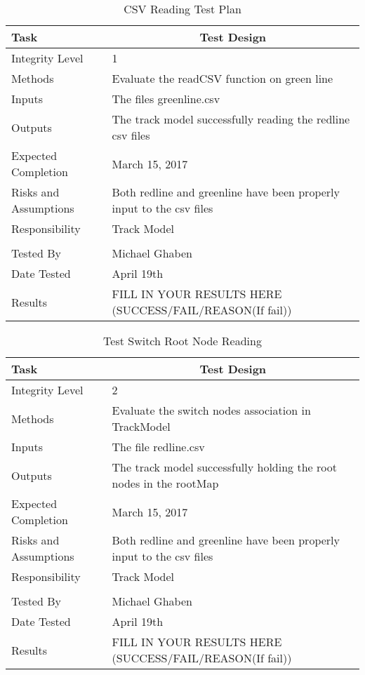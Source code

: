 \documentclass[]{article}
\begin{document}
\begin{table}[H]
	\centering
	\caption{CSV Reading Test Plan}
	\begin{tabular}{|l|l|}
		\hline
		Task & \multicolumn{1}{c|}{Test Design} \\ \hline
		Integrity Level & 1 \\ \hline
		Methods & Evaluate the readCSV function on green line\\ \hline
		Inputs &  The files greenline.csv \\ \hline
		Outputs &  The track model successfully reading the redline csv files\\ \hline
		Expected Completion & March 15, 2017\\ \hline
		Risks and Assumptions & \parbox[t]{10cm}{Both redline and greenline have been properly input to the csv files}\\ \hline
		Responsibility & Track Model\\ \hline
		\\ \hline
		Tested By   &  Michael Ghaben\\	\hline
		Date Tested & \parbox[t]{10cm}{April 19th}\\ \hline
		Results & FILL IN YOUR RESULTS HERE (SUCCESS/FAIL/REASON(If fail))\\ \hline
	\end{tabular}
\end{table}

\begin{table}[H]
	\centering
	\caption{Test Switch Root Node Reading}
	\begin{tabular}{|l|l|}
		\hline
		Task & \multicolumn{1}{c|}{Test Design} \\ \hline
		Integrity Level & 2 \\ \hline
		Methods & \parbox[t]{10cm}{Evaluate the switch nodes association in TrackModel}\\ \hline
		Inputs &  The file redline.csv \\ \hline
		Outputs &  The track model successfully holding the root nodes in the rootMap\\ \hline
		Expected Completion & March 15, 2017\\ \hline
		Risks and Assumptions & Both redline and greenline have been properly input to the csv files \\ \hline
		Responsibility & Track Model\\ \hline
		\\ \hline
		Tested By   &  Michael Ghaben\\	\hline
		Date Tested & \parbox[t]{10cm}{April 19th}\\ \hline
		Results & FILL IN YOUR RESULTS HERE (SUCCESS/FAIL/REASON(If fail))\\ \hline
	\end{tabular}
\end{table}
\end{document}
